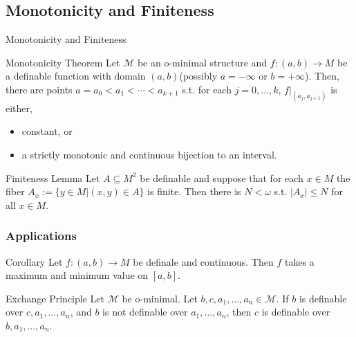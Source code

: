 \subsection{Monotonicity and Finiteness}

\begin{frame}{Monotonicity and Finiteness}
	\begin{block}{Monotonicity Theorem}
		Let $\mathcal{M}$ be an o-minimal structure and $f:(a,b) \to M$ be a definable function with domain $(a,b)$(possibly $a=- \infty$ or $b=+ \infty$).
		Then, there are points $a=a_0<a_1< \cdots <a_{k+1}$ s.t. for each $j=0,\ldots,k$, $f|_{(a_j,a_{j+1})}$ is either,
		\begin{itemize}
			\item constant, or
			\item a strictly monotonic and continuous bijection to an interval.
		\end{itemize}
 	\end{block}

 	\begin{beamerboxesrounded}[shadow=true]{Finiteness Lemma}
 		Let $A \subseteq M^2$ be definable and suppose that for each $x \in M$ the fiber $A_x := \{ y \in M|(x,y) \in A \}$ is finite.
		Then there is $N < \omega$ s.t. $|A_x| \leq N$ for all $x \in M$. 
 	\end{beamerboxesrounded}
\end{frame}


\begin{frame}[t]\frametitle{Applications}	
    
	\begin{block}{Corollary}
		Let $f:(a,b) \to M$ be definale and continuous. Then $f$ takes a maximum and minimum value on $[a,b]$.
	\end{block}

	\begin{block}{Exchange Principle}
		Let $\mathcal{M}$ be o-minimal.
		Let $b,c,a_1,\ldots,a_n \in \mathcal{M}$.
		If $b$ is definable over $c,a_1,\ldots,a_n$, and $b$ is not definable over $a_1,\ldots,a_n$, then $c$ is definable over $b,a_1,\ldots,a_n$.
	\end{block}

\end{frame}